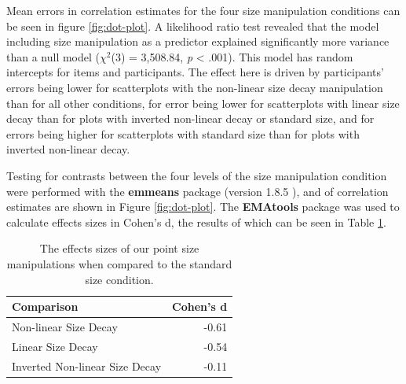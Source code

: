 \documentclass{vgtc}                          %
\begin{document}
Mean errors in correlation estimates for the four size manipulation conditions
can be seen in figure \ref{fig:dot-plot}. A likelihood ratio test revealed that the
model including size manipulation as a predictor explained significantly more
variance than a null model (\(\chi^2\)(3) = 3,508.84,
\emph{p} \textless{} .001). This model has random intercepts for
items and participants. The effect here is driven by participants' errors being lower
for scatterplots with the non-linear size decay manipulation than for all other conditions,
for error being lower for scatterplots with linear size decay than for plots with
inverted non-linear decay or standard size, and for errors being higher for scatterplots
with standard size than for plots with inverted non-linear decay.

Testing for contrasts between the four levels of the size manipulation condition
were performed with the \textbf{emmeans} package (version 1.8.5 \cite{emmeans}), and
of correlation estimates are shown in Figure \ref{fig:dot-plot}. The \textbf{EMAtools} package
was used to calculate effects sizes in Cohen's d, the results of which can be seen in
Table \ref{tab:effects-df}.

\begin{table}

\caption{\label{tab:contrasts-table}contrasts table}
\centering
{}
\end{table}

\begin{table}

\caption{\label{tab:effects-df}The effects sizes of our point size manipulations when compared to the standard size condition.}
\centering
\begin{tabular}[t]{lr}
\toprule
Comparison & Cohen's d\\
\midrule
Non-linear Size Decay & -0.61\\
Linear Size Decay & -0.54\\
Inverted Non-linear Size Decay & -0.11\\
\bottomrule
\end{tabular}
\end{table}
\end{document}
